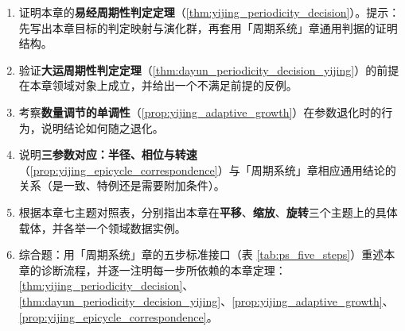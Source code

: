 \begin{enumerate}[leftmargin=3em, label=\textbf{题 \arabic*}]
    \item 证明本章的\textbf{易经周期性判定定理}（\ref{thm:yijing_periodicity_decision}）。提示：先写出本章目标的判定映射与演化群，再套用「周期系统」章通用判据的证明结构。

    \item 验证\textbf{大运周期性判定定理}（\ref{thm:dayun_periodicity_decision_yijing}）的前提在本章领域对象上成立，并给出一个不满足前提的反例。

    \item 考察\textbf{数量调节的单调性}（\ref{prop:yijing_adaptive_growth}）在参数退化时的行为，说明结论如何随之退化。

    \item 说明\textbf{三参数对应：半径、相位与转速}（\ref{prop:yijing_epicycle_correspondence}）与「周期系统」章相应通用结论的关系（是一致、特例还是需要附加条件）。

    \item 根据本章七主题对照表，分别指出本章在\textbf{平移}、\textbf{缩放}、\textbf{旋转}三个主题上的具体载体，并各举一个领域数据实例。

    \item 综合题：用「周期系统」章的五步标准接口（表 \ref{tab:ps_five_steps}）重述本章的诊断流程，并逐一注明每一步所依赖的本章定理：\ref{thm:yijing_periodicity_decision}、\ref{thm:dayun_periodicity_decision_yijing}、\ref{prop:yijing_adaptive_growth}、\ref{prop:yijing_epicycle_correspondence}。
\end{enumerate}


